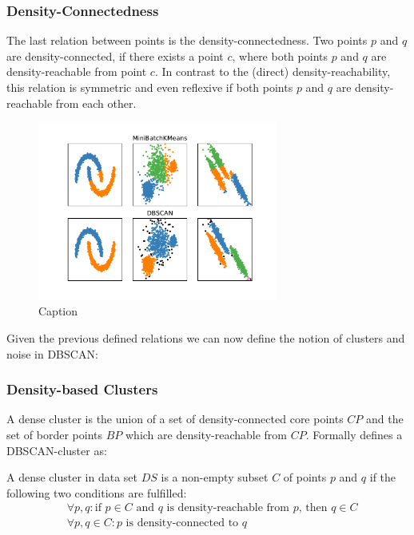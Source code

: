 \subsubsection*{Density-Connectedness}
The last relation between points is the density-connectedness. Two points $p$ and $q$ are density-connected, if there exists a point $c$, where both points $p$ and $q$ are density-reachable from point $c$. In contrast to the (direct) density-reachability, this relation is symmetric and even reflexive if both points $p$ and $q$ are density-reachable from each other. 
\begin{figure}
    \centering
    \includegraphics[width=0.7\textwidth]{figures/KMeansVSDBSCAN.pdf}
    \caption{Caption}
    \label{fig:kmeansdbscan}
\end{figure}

\vspace{5mm}

Given the previous defined relations we can now define the notion of clusters and noise in DBSCAN:

\subsubsection*{Density-based Clusters}
A dense cluster is the union of a set of density-connected core points $CP$ and the set of border points $BP$ which are density-reachable from $CP$.
Formally \citeauthor{DBSCANEKSX96} defines a DBSCAN-cluster as:

A dense cluster in data set $DS$ is a non-empty subset $C$ of points $p$ and $q$ if the following two conditions are fulfilled:
\begin{align}
    &\forall p, q: \text{if } p \in C \text{ and } q \text{ is density-reachable from } p \text{, then } q \in C \\
    &\forall p, q \in C: p \text{ is density-connected to }q
\end{align}

